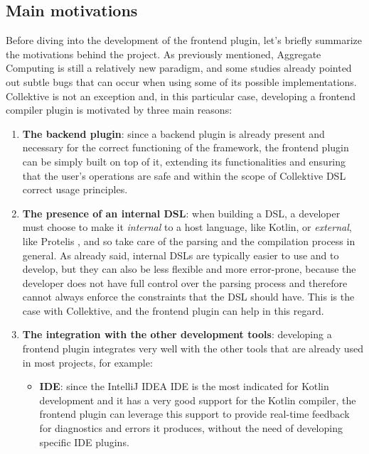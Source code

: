 \documentclass[12pt,a4paper,openright,twoside]{book}
\begin{document}
\subsection{Main motivations}

Before diving into the development of the frontend plugin, let's briefly
summarize the motivations behind the project. As previously mentioned, Aggregate
Computing is still a relatively new paradigm, and some studies
\cite{DBLP:conf/saso/AudritoDVC16} already pointed out subtle bugs that can
occur when using some of its possible implementations. 
%
Collektive is not an exception and, in this particular case, developing a
frontend compiler plugin is motivated by three main reasons:
\begin{enumerate}
  \item \textbf{The backend plugin}: since a backend plugin is already present
  and necessary for the correct functioning of the framework, the frontend
  plugin can be simply built on top of it, extending its functionalities and
  ensuring that the user's operations are safe and within the scope of
  Collektive \ac{DSL} correct usage principles.

  \item \textbf{The presence of an internal DSL}: when building a \ac{DSL}, a
  developer must choose to make it \emph{internal} to a host language, like
  Kotlin, or \emph{external}, like Protelis \cite{DBLP:conf/saso/PianiniBV17},
  and so take care of the parsing and the compilation process in general.
  As already said, internal \acp{DSL} are typically easier to use and to
  develop, but they can also be less flexible and more error-prone, because the
  developer does not have full control over the parsing process and therefore
  cannot always enforce the constraints that the DSL should have. This is the
  case with Collektive, and the frontend plugin can help in this regard.
  
  \item \textbf{The integration with the other development tools}: developing a
  frontend plugin integrates very well with the other tools that are already 
  used in most projects, for example:

  \begin{itemize}
    \item \textbf{IDE}: since the IntelliJ IDEA \ac{IDE} is the most indicated
    for Kotlin development and it has a very good support for the Kotlin
    compiler, the frontend plugin can leverage this support to provide real-time
    feedback for diagnostics and errors it produces, without the need of
    developing specific \ac{IDE} plugins.


\end{itemize}
\end{enumerate}
\end{document}
